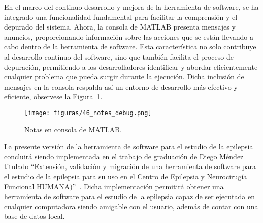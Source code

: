 En el marco del continuo desarrollo y mejora de la herramienta de software, se ha integrado una funcionalidad fundamental para facilitar la comprensión y el depurado del sistema. Ahora, la consola de MATLAB presenta mensajes y anuncios, proporcionando información sobre las acciones que se están llevando a cabo dentro de la herramienta de software. Esta característica no solo contribuye al desarrollo continuo del software, sino que también facilita el proceso de depuración, permitiendo a los desarrolladores identificar y abordar eficientemente cualquier problema que pueda surgir durante la ejecución. Dicha inclusión de mensajes en la consola respalda así un entorno de desarrollo más efectivo y eficiente, observese la Figura~\ref{fig: debbug_matlab}.

\begin{figure}[H]
    \centering
    \texttt{[image: figuras/46\_notes\_debug.png]}
    \caption{Notas en consola de MATLAB.}
    \label{fig: debbug_matlab}
\end{figure}

La presente versión de la herramienta de software para el estudio de la epilepsia concluirá siendo implementada en el trabajo de graduación de Diego Méndez titulado ``Extensión, validación y migración de una herramienta de software para el estudio de la epilepsia para su uso en el Centro de Epilepsia y Neurocirugía Funcional HUMANA)''~\cite{diego_2023}. Dicha implementación permitirá obtener una herramienta de software para el estudio de la epilepsia capaz de ser ejecutada en cualquier computadora siendo amigable con el usuario, además de contar con una base de datos local.  


